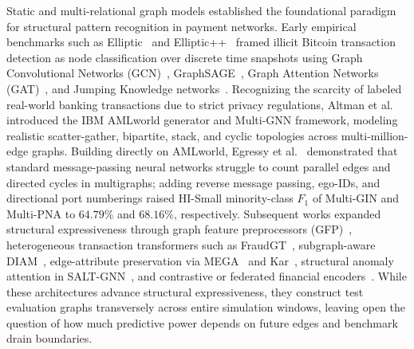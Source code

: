 \documentclass[pdflatex,sn-mathphys,Numbered]{sn-jnl}
\theoremstyle{thmstyleone}
\begin{document}
Static and multi-relational graph models established the foundational paradigm for structural pattern recognition in payment networks. Early empirical benchmarks such as Elliptic~\cite{weber2019elliptic} and Elliptic++~\cite{elmougy2023ellipticpp} framed illicit Bitcoin transaction detection as node classification over discrete time snapshots using Graph Convolutional Networks (GCN)~\cite{kipf2017gcn}, GraphSAGE~\cite{hamilton2017sage}, Graph Attention Networks (GAT)~\cite{velickovic2018gat}, and Jumping Knowledge networks~\cite{xu2018jk}. Recognizing the scarcity of labeled real-world banking transactions due to strict privacy regulations, Altman et al.~\cite{altman2023ibmaml} introduced the IBM AMLworld generator and Multi-GNN framework, modeling realistic scatter-gather, bipartite, stack, and cyclic topologies across multi-million-edge graphs. Building directly on AMLworld, Egressy et al.~\cite{egressy2024multigraph} demonstrated that standard message-passing neural networks struggle to count parallel edges and directed cycles in multigraphs; adding reverse message passing, ego-IDs, and directional port numberings raised HI-Small minority-class $F_1$ of Multi-GIN and Multi-PNA to $64.79\%$ and $68.16\%$, respectively. Subsequent works expanded structural expressiveness through graph feature preprocessors (GFP)~\cite{blanusa2024gfp}, heterogeneous transaction transformers such as FraudGT~\cite{lin2024fraudgt}, subgraph-aware DIAM~\cite{ding2024diam}, edge-attribute preservation via MEGA~\cite{bilgi2026mega} and Kar~\cite{tian2025kar}, structural anomaly attention in SALT-GNN~\cite{losavio2026saltgnn}, and contrastive or federated financial encoders~\cite{han2026fgegcn,jia2025lmae4eth,asiri2025gcn,alemari2026explainable}. While these architectures advance structural expressiveness, they construct test evaluation graphs transversely across entire simulation windows, leaving open the question of how much predictive power depends on future edges and benchmark drain boundaries.
\end{document}
